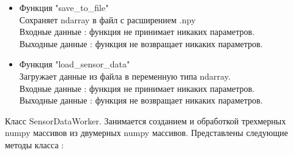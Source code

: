 \documentclass[a4document]{article}
\begin{document}
{\begin{itemize}
\begin{itemize}
                Очищает массив.\\
                Входные данные : функция не принимает никаких параметров. \\ 
                Выходные данные : функция не возвращает никаких параметров.
            \item Функция "save\_to\_file" \\
                Сохраняет ndarray в файл с расширением .npy \\
                Входные данные : функция не принимает никаких параметров. \\ 
                Выходные данные : функция не возвращает никаких параметров.
            \item Функция "load\_sensor\_data" \\
                Загружает данные из файла в переменную типа ndarray.\\
                Входные данные : функция не принимает никаких параметров. \\ 
                Выходные данные : функция не возвращает никаких параметров.

        \end{itemize}

        \bigbreak
        Класс SensorDataWorker.
        Занимается созданием и обработкой трехмерных numpy массивов из двумерных numpy массивов.
        Представлены следующие методы класса :
        

\end{itemize}}
\end{document}
